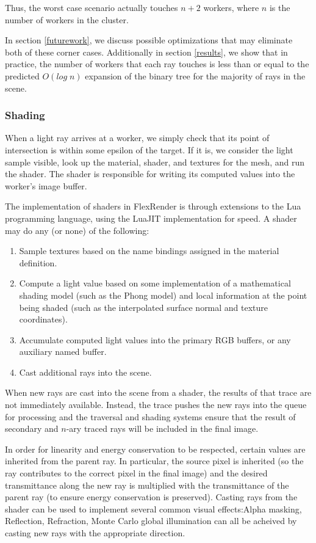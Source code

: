 \documentclass[a4paper,twoside]{article}
\begin{document}
Thus, the worst case scenario actually touches $n + 2$ workers, where $n$ is the
number of workers in the cluster.

In section \ref{futurework}, we discuss possible optimizations that may eliminate
both of these corner cases. Additionally in section \ref{results}, we show that
in practice, the number of workers that each ray touches is less than or equal
to the predicted $O(log\;n)$ expansion of the binary tree for the majority
of rays in the scene.


\subsubsection{Shading}
\label{shading}

When a light ray arrives at a worker, we simply check that its point of
intersection is within some epsilon of the target. If it is, we consider the
light sample visible, look up the material, shader, and textures for the mesh,
and run the shader. The shader is responsible for writing its computed values
into the worker's image buffer.

The implementation of shaders in FlexRender is through extensions to the Lua
\cite{lua} programming language, using the LuaJIT \cite{luajit} implementation
for speed. A shader may do any (or none) of the following:

\begin{enumerate}
    \item Sample textures based on the name bindings assigned in the material
        definition.
    \item Compute a light value based on some implementation of a mathematical
        shading model (such as the Phong model) and local information at the
        point being shaded (such as the interpolated surface normal and texture
        coordinates).
    \item Accumulate computed light values into the primary RGB buffers, or
        any auxiliary named buffer.
    \item Cast additional rays into the scene.
\end{enumerate}

When new rays are cast into the scene from a shader, the results of that trace
are not immediately available. Instead, the trace pushes the new rays into the
queue for processing and the traversal and shading systems ensure that the
result of secondary and $n$-ary traced rays will be included in the final image.

In order for linearity and energy conservation to be respected, certain values
are inherited from the parent ray. In particular, the source pixel is inherited
(so the ray contributes to the correct pixel in the final image) and the
desired transmittance along the new ray is multiplied with the transmittance of
the parent ray (to ensure energy conservation is preserved).  Casting rays from the shader can be used to implement several common visual
effects:Alpha masking, Reflection, Refraction, Monte Carlo global illumination can all be acheived 
by casting new rays with the appropriate direction.
\end{document}
